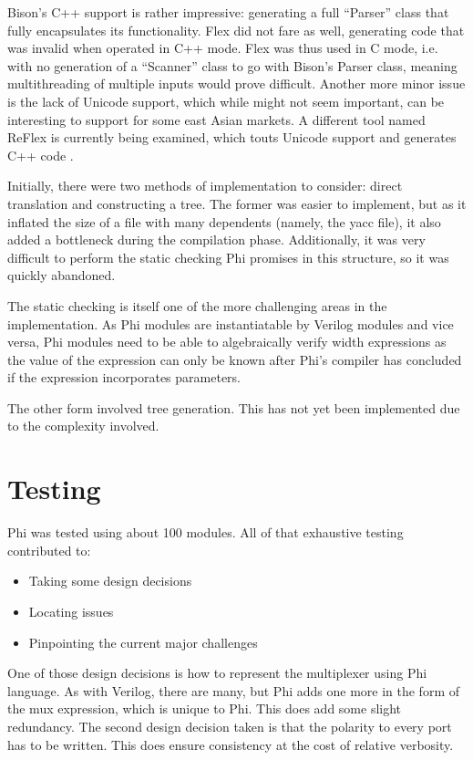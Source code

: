 \documentclass[10pt, two column]{article}
\theoremstyle{definition}
\begin{document}
Bison’s C++ support is rather impressive: generating a full “Parser” class that fully encapsulates its functionality. Flex did not fare as well, generating code that was invalid when operated in C++ mode. Flex was thus used in C mode, i.e. with no generation of a “Scanner” class to go with Bison’s Parser class, meaning multithreading of multiple inputs would prove difficult. Another more minor issue is the lack of Unicode support, which while might not seem important, can be interesting to support for some east Asian markets. A different tool named ReFlex is currently being examined, which touts Unicode support and generates C++ code \cite{reflex}.\newline

Initially, there were two methods of implementation to consider: direct translation and constructing a tree. The former was easier to implement, but as it inflated the size of a file with many dependents (namely, the yacc file), it also added a bottleneck during the compilation phase. Additionally, it was very difficult to perform the static checking Phi promises in this structure, so it was quickly abandoned.\newline

The static checking is itself one of the more challenging areas in the implementation. As Phi modules are instantiatable by Verilog modules and vice versa, Phi modules need to be able to algebraically verify width expressions as the value of the expression can only be known after Phi’s compiler has concluded if the expression incorporates parameters.\newline

The other form involved tree generation. This has not yet been implemented due to the complexity involved. 

\section{Testing}
Phi was tested using about 100 modules. All of that exhaustive testing contributed to: 
\begin{itemize}
	\item Taking some design decisions 
	\item Locating issues
	\item Pinpointing the current major challenges 
\end{itemize} 

One of those design decisions is how to represent the multiplexer using Phi language. As with Verilog, there are many, but Phi adds one more in the form of the mux expression, which is unique to Phi. This does add some slight redundancy. The second design decision taken is that the polarity to every port has to be written. This does ensure consistency at the cost of relative verbosity.\newline
 
\end{document}
